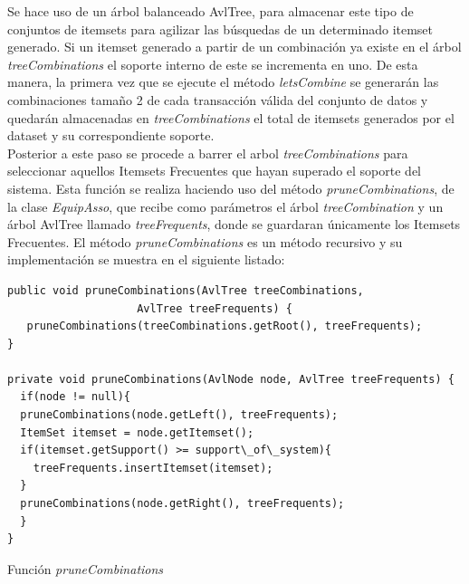 Se hace uso de un \'arbol balanceado AvlTree, para almacenar este tipo de conjuntos de itemsets para agilizar las
b\'usquedas de un determinado itemset generado.  Si un itemset generado a partir de un combinaci\'on ya existe en
el \'arbol \textit{treeCombinations} el soporte interno de este se incrementa en uno.  De esta manera, la primera
vez que se ejecute el m\'etodo \textit{letsCombine} se generar\'an las combinaciones tama\~no 2 de cada
transacci\'on v\'alida del conjunto de datos y quedar\'an almacenadas en \textit{treeCombinations} el total de
itemsets generados por el dataset y su correspondiente soporte.\\

Posterior a este paso se procede a barrer el arbol \textit{treeCombinations} para seleccionar aquellos Itemsets
Frecuentes que hayan superado el soporte del sistema.  Esta funci\'on se realiza haciendo uso del m\'etodo
\textit{pruneCombinations}, de la clase \textit{EquipAsso}, que recibe como par\'ametros el \'arbol 
\textit{treeCombination} y un \'arbol AvlTree llamado \textit{treeFrequents}, donde se guardaran \'unicamente los
Itemsets Frecuentes.  El m\'etodo \textit{pruneCombinations} es un m\'etodo recursivo y su implementaci\'on se
muestra en el siguiente listado:\\

\begin{codigof}[h]
\begin{verbatim}
public void pruneCombinations(AvlTree treeCombinations,
                    AvlTree treeFrequents) {
   pruneCombinations(treeCombinations.getRoot(), treeFrequents);
}

private void pruneCombinations(AvlNode node, AvlTree treeFrequents) {
  if(node != null){
  pruneCombinations(node.getLeft(), treeFrequents);
  ItemSet itemset = node.getItemset();
  if(itemset.getSupport() >= support\_of\_system){
    treeFrequents.insertItemset(itemset);
  }
  pruneCombinations(node.getRight(), treeFrequents);
  }
}
\end{verbatim}
\caption{Funci\'on \textit{pruneCombinations}}
\end{codigof}

